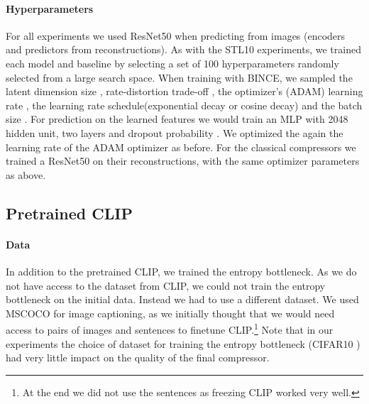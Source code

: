 \documentclass[final]{article}
\begin{document}
\paragraph{Hyperparameters}
For all experiments we used ResNet50 when predicting from images (\ie encoders and predictors from reconstructions).
As with the STL10 experiments, we trained each model and baseline by selecting a set of 100 hyperparameters randomly selected from a large search space.
When training with BINCE, we sampled the latent dimension size , rate-distortion trade-off  , the optimizer's (ADAM) learning rate , the learning rate schedule(exponential decay or cosine decay) and the batch size . For prediction on the learned features we would train an MLP with 2048 hidden unit, two layers and dropout probability . We optimized the again the learning rate of the ADAM optimizer as before.
For the classical compressors we trained a ResNet50 on their reconstructions, with the same optimizer parameters as above.

\subsection{Pretrained CLIP}
\label{appx:reproducability_clip}


\paragraph{Data}
In addition to the pretrained CLIP, we trained the entropy bottleneck.
As we do not have access to the dataset from CLIP, we could not train the entropy bottleneck on the initial data.
Instead we had to use a different dataset.
We used MSCOCO \cite{lin_microsoft_2015} for image captioning, as we initially thought that we would need access to pairs of images and sentences to finetune CLIP.\footnote{
At the end we did not use the sentences as freezing CLIP worked very well.}
Note that in our experiments the choice of dataset for training the entropy bottleneck (\eg CIFAR10 \cite{krizhevsky_learning_2009}) had very little impact on the quality of the final compressor.
\end{document}
